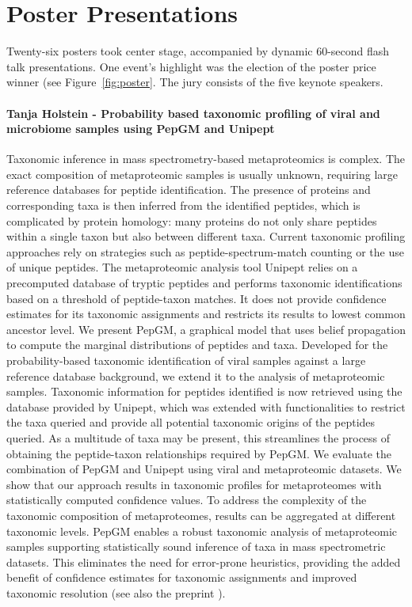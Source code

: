 \section{Poster Presentations}


Twenty-six posters took center stage, accompanied by dynamic 60-second flash talk presentations. One event's highlight was the election of the poster price winner (see Figure~\ref{fig:poster}. The jury consists of the five keynote speakers.


\paragraph{Tanja Holstein - Probability based taxonomic profiling of viral and microbiome samples using PepGM and Unipept}

Taxonomic inference in mass spectrometry-based metaproteomics is complex. The exact composition of metaproteomic samples is usually unknown, requiring large reference databases for peptide identification. The presence of proteins and corresponding taxa is then inferred from the identified peptides, which is complicated by protein homology: many proteins do not only share peptides within a single taxon but also between different taxa. Current taxonomic profiling approaches rely on strategies such as peptide-spectrum-match counting or the use of unique peptides. The metaproteomic analysis tool Unipept relies on a precomputed database of tryptic peptides and performs taxonomic identifications based on a threshold of peptide-taxon matches. It does not provide confidence estimates for its taxonomic assignments and restricts its results to lowest common ancestor level.
We present PepGM, a graphical model that uses belief propagation to compute the marginal distributions of peptides and taxa. Developed for the probability-based taxonomic identification of viral samples against a large reference database background, we extend it to the analysis of metaproteomic samples. Taxonomic information for peptides identified is now retrieved using the database provided by Unipept, which was extended with functionalities to restrict the taxa queried and provide all potential taxonomic origins of the peptides queried. As a multitude of taxa may be present, this streamlines the process of obtaining the peptide-taxon relationships required by PepGM.
We evaluate the combination of PepGM and Unipept using viral and metaproteomic datasets. We show that our approach results in taxonomic profiles for metaproteomes with statistically computed confidence values. To address the complexity of the taxonomic composition of metaproteomes, results can be aggregated at different taxonomic levels. PepGM enables a robust taxonomic analysis of metaproteomic samples supporting statistically sound inference of taxa in mass spectrometric datasets. This eliminates the need for error-prone heuristics, providing the added benefit of confidence estimates for taxonomic assignments and improved taxonomic resolution (see also the preprint \citep{Holstein2024}).

